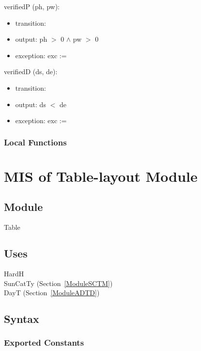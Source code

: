 \documentclass[12pt, titlepage]{article}
\begin{document}
\noindent  verifiedP (ph, pw):
\begin{itemize}
\item transition: 
\item output: ph $>$ 0 $\land$ pw $>$ 0 

\item exception: exc := 
\end{itemize}

\noindent  verifiedD (ds, de):
\begin{itemize}
\item transition: 
\item output: ds $<$ de 

\item exception: exc := 
\end{itemize}

\subsubsection{Local Functions}



\newpage



\section{MIS of Table-layout Module} \label{ModuleT} 

\subsection{Module}
Table\\

\subsection{Uses}
HardH\\
SunCatTy (Section~\ref{ModuleSCTM}) \\
DayT (Section~\ref{ModuleADTD}) \\

\subsection{Syntax}

\subsubsection{Exported Constants}
\end{document}
